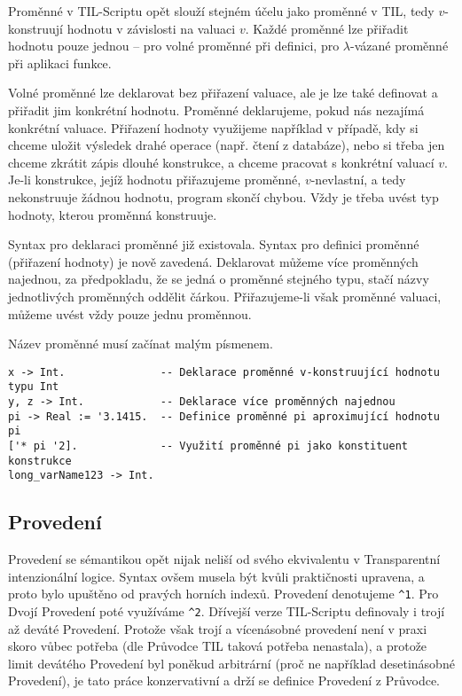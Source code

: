 Proměnné v TIL-Scriptu opět slouží stejném účelu jako proměnné v TIL, tedy $v$-konstruují hodnotu
v závislosti na valuaci $v$. Každé proměnné lze přiřadit hodnotu pouze jednou -- pro volné proměnné
při definici, pro $\lambda$-vázané proměnné při aplikaci funkce.

Volné proměnné lze deklarovat bez přiřazení valuace, ale je lze také definovat a přiřadit jim
konkrétní hodnotu. Proměnné deklarujeme, pokud nás nezajímá konkrétní valuace. Přiřazení hodnoty
využijeme například v případě, kdy si chceme uložit výsledek drahé operace (např. čtení
z databáze), nebo si třeba jen chceme zkrátit zápis dlouhé konstrukce, a chceme pracovat
s konkrétní valuací $v$. Je-li konstrukce, jejíž hodnotu přiřazujeme proměnné, $v$-nevlastní,
a tedy nekonstruuje žádnou hodnotu, program skončí chybou. Vždy je třeba uvést typ hodnoty, kterou
proměnná konstruuje.

Syntax pro deklaraci proměnné již existovala. Syntax pro definici proměnné (přiřazení hodnoty)
je nově zavedená. Deklarovat můžeme více proměnných najednou, za předpokladu, že se jedná o
proměnné stejného typu, stačí názvy jednotlivých proměnných oddělit čárkou. Přiřazujeme-li však
proměnné valuaci, můžeme uvést vždy pouze jednu proměnnou.

Název proměnné musí začínat malým písmenem. 

\begin{lstlisting}[caption={Příklad využití proměnných}]
x -> Int.               -- Deklarace proměnné v-konstruující hodnotu typu Int
y, z -> Int.            -- Deklarace více proměnných najednou
pi -> Real := '3.1415.  -- Definice proměnné pi aproximující hodnotu pi
['* pi '2].             -- Využití proměnné pi jako konstituent konstrukce
long_varName123 -> Int.
\end{lstlisting}

\subsection{Provedení}

Provedení se sémantikou opět nijak neliší od svého ekvivalentu v Transparentní intenzionální logice.
Syntax ovšem musela být kvůli praktičnosti upravena, a proto bylo upuštěno od pravých horních
indexů. Provedení denotujeme \lstinline{^1}. Pro Dvojí Provedení poté využíváme \lstinline{^2}.
Dřívejší verze TIL-Scriptu definovaly i trojí až deváté Provedení. Protože však trojí a vícenásobné
provedení není v praxi skoro vůbec potřeba (dle Průvodce TIL taková potřeba nenastala), a protože
limit devátého Provedení byl poněkud arbitrární (proč ne například desetinásobné Provedení), je
tato práce konzervativní a drží se definice Provedení z Průvodce.

